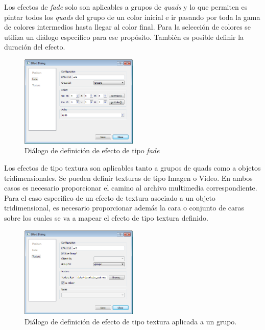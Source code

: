 Los efectos de \emph{fade} solo son aplicables a grupos de \emph{quads} y lo que permiten es pintar todos los \emph{quads} del grupo de un color inicial e ir pasando por toda la gama de colores intermedios hasta llegar al color final. Para la selección de colores se utiliza un diálogo específico para ese propósito. También es posible definir la duración del efecto.

\begin{figure}[H]
  \centering
    \includegraphics[width=0.5\textwidth]{./Cap5_vmt/vmt_EfectDialog2.png}
  \caption{Diálogo de definición de efecto de tipo \emph{fade}}
  \label{fig:VMT-EffectFade}
\end{figure}

Los efectos de tipo textura son aplicables tanto a grupos de quads como a objetos tridimensionales. Se pueden definir texturas de tipo Imagen o Video. En ambos casos es necesario proporcionar el camino al archivo multimedia correspondiente. Para el caso especifico de un efecto de textura asociado a un objeto tridimensional, es necesario proporcionar además la cara o conjunto de caras sobre los cuales se va a mapear el efecto de tipo textura definido.

\begin{figure}[H]
  \centering
    \includegraphics[width=0.5\textwidth]{./Cap5_vmt/vmt_EfectDialog3.png}
  \caption{Diálogo de definición de efecto de tipo textura aplicada a un grupo.}
  \label{fig:VMT-EffectTexture}
\end{figure}

